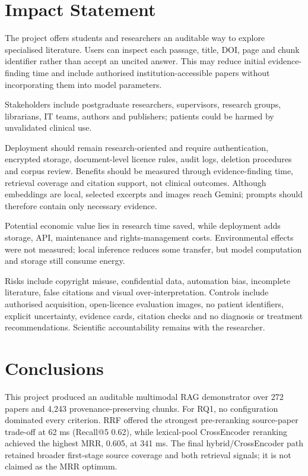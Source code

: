 \documentclass[11pt,a4paper]{article}
\begin{document}
\FloatBarrier
\section{Impact Statement}
\label{sec:impact-statement}

The project offers students and researchers an auditable way to explore specialised literature. Users can inspect each passage, title, DOI, page and chunk identifier rather than accept an uncited answer. This may reduce initial evidence-finding time and include authorised institution-accessible papers without incorporating them into model parameters.

Stakeholders include postgraduate researchers, supervisors, research groups, librarians, IT teams, authors and publishers; patients could be harmed by unvalidated clinical use.

Deployment should remain research-oriented and require authentication, encrypted storage, document-level licence rules, audit logs, deletion procedures and corpus review. Benefits should be measured through evidence-finding time, retrieval coverage and citation support, not clinical outcomes. Although embeddings are local, selected excerpts and images reach Gemini; prompts should therefore contain only necessary evidence.

Potential economic value lies in research time saved, while deployment adds storage, API, maintenance and rights-management costs. Environmental effects were not measured; local inference reduces some transfer, but model computation and storage still consume energy.

Risks include copyright misuse, confidential data, automation bias, incomplete literature, false citations and visual over-interpretation. Controls include authorised acquisition, open-licence evaluation images, no patient identifiers, explicit uncertainty, evidence cards, citation checks and no diagnosis or treatment recommendations. Scientific accountability remains with the researcher.

\FloatBarrier
\section{Conclusions}
\label{sec:conclusions}

This project produced an auditable multimodal RAG demonstrator over 272 papers and 4,243 provenance-preserving chunks. For RQ1, no configuration dominated every criterion. RRF offered the strongest pre-reranking source-paper trade-off at 62 ms (Recall@5 0.62), while lexical-pool CrossEncoder reranking achieved the highest MRR, 0.605, at 341 ms. The final hybrid/CrossEncoder path retained broader first-stage source coverage and both retrieval signals; it is not claimed as the MRR optimum.
\end{document}
